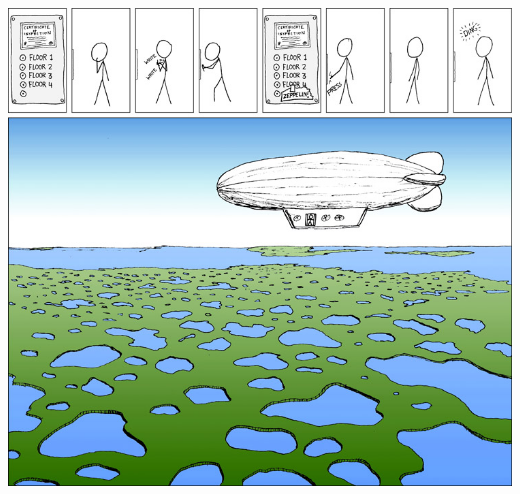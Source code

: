 \begin{center}
  \vspace*{2cm}
\begin{minipage}[b]{\textwidth}
\parindent=0in\raggedleft
{\Huge \bf \sf \makeatletter\@title\makeatother}

\vspace*{5mm}

\noindent{\large\makeatletter\@author\makeatletter}

\vspace*{5mm}
\includegraphics[height=160mm]{figures/elevator_zep.jpg}
\end{minipage}
\end{center}
\pagestyle{empty}
\cleardoublepage
\setcounter{page}{1}
